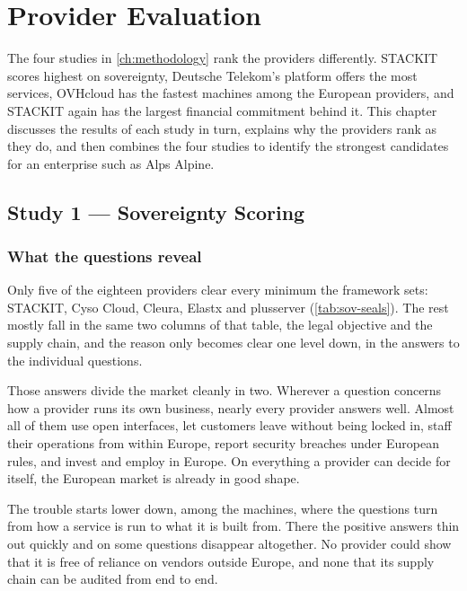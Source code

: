 \chapter{Provider Evaluation}
\label{ch:evaluation}

The four studies in \cref{ch:methodology} rank the providers differently. STACKIT
scores highest on sovereignty, Deutsche Telekom's platform offers the most
services, OVHcloud has the fastest machines among the European providers, and
STACKIT again has the largest financial commitment behind it. This chapter
discusses the results of each study in turn, explains why the providers rank as
they do, and then combines the four studies to identify the strongest candidates
for an enterprise such as Alps Alpine.

\section{Study 1 --- Sovereignty Scoring}
\label{sec:study1}

\subsection{What the questions reveal}
\label{subsec:study1-results}

Only five of the eighteen providers clear every minimum the framework sets:
STACKIT, Cyso Cloud, Cleura, Elastx and plusserver (\cref{tab:sov-seals}). The
rest mostly fall in the same two columns of that table, the legal objective and
the supply chain, and the reason only becomes clear one level down, in the
answers to the individual questions.

Those answers divide the market cleanly in two. Wherever a question concerns how
a provider runs its own business, nearly every provider answers well. Almost all
of them use open interfaces, let customers leave without being locked in, staff
their operations from within Europe, report security breaches under European
rules, and invest and employ in Europe. On everything a provider can decide for
itself, the European market is already in good shape.

The trouble starts lower down, among the machines, where the questions turn from
how a service is run to what it is built from. There the positive answers thin
out quickly and on some questions disappear altogether. No provider could show
that it is free of reliance on vendors outside Europe, and none that its supply
chain can be audited from end to end.

